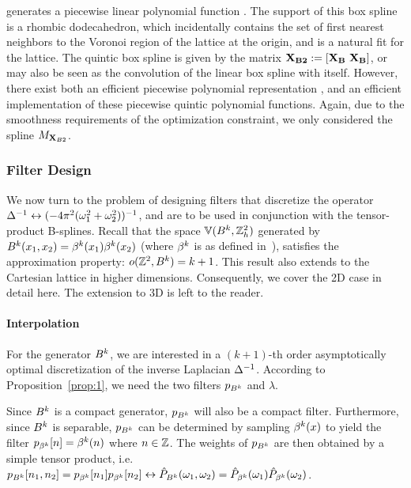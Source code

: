 generates a piecewise linear polynomial function \cite{practicalbox}. The support of this box spline is a rhombic dodecahedron, which incidentally contains the set of first nearest neighbors to the Voronoi region of the lattice at the origin, and is a natural fit for the lattice. The quintic box spline is given by the matrix $\mathbf{\Xii_{B2}} := \left[\mathbf{\Xii_{B}} \ \mathbf{\Xii_{B}}\right]$, or may also be seen as the convolution of the linear box spline with itself.  However, there exist both an efficient piecewise polynomial representation \cite{practicalbox}, and an efficient implementation \cite{fastbox} of these piecewise quintic polynomial functions. Again, due to the smoothness requirements of the optimization constraint, we only considered the spline $M_{\Xii_{B2}}$.

\subsubsection{Filter Design}
\label{sec:poissonFilterDesign}

We now turn to the problem of designing filters that discretize the operator
$\ftpairs{\invlaplacian}{(-4\pi^2(\omega_1^2 +
  \omega_2^2))^{-1}}$, and
are to be used in conjunction with the tensor-product B-splines. Recall that the
space $\aspace{\ints^2_h}{\tpbs^k}$ generated by $\tpbs^k(x_1,x_2) =
\cbs^{k}(x_1)\cbs^{k}(x_2)$ (where $\cbs^k$ is as defined
in~), satisfies the approximation property:
$\order{\ints^2}{\tpbs^k}=k+1$. This result also extends to the Cartesian lattice in
higher dimensions. Consequently, we cover the 2D case in detail here. The
extension to 3D is left to the reader.

\paragraph{Interpolation}
For the generator $\tpbs^k$, we are interested in a $(k+1)$-th order
asymptotically optimal discretization of the inverse Laplacian
$\invlaplacian$. According to Proposition~\ref{prop:1}, we need the
two filters $p_{\tpbs^k}$ and $\lambda$.

Since $\tpbs^k$ is a compact generator, $p_{\tpbs^k}$ will also be a compact
filter. Furthermore, since $\tpbs^k$ is separable, $p_{\tpbs^k}$ can be
determined by sampling $\cbs^k(x)$ to yield the filter $p_{\cbs^k}[n] =
\cbs^k(n)$ where $n \in \ints$. The weights of $p_{\tpbs^k}$ are then obtained
by a simple tensor product, i.e. $p_{\tpbs^k}[n_1,n_2] =
p_{\cbs^k}[n_1]p_{\cbs^k}[n_2] \ftpairs{}{} \ft{P}_{\tpbs^k}(\omega_1,\omega_2)
= \ft{P}_{\cbs^k}(\omega_1)\ft{P}_{\cbs^k}(\omega_2)$.

